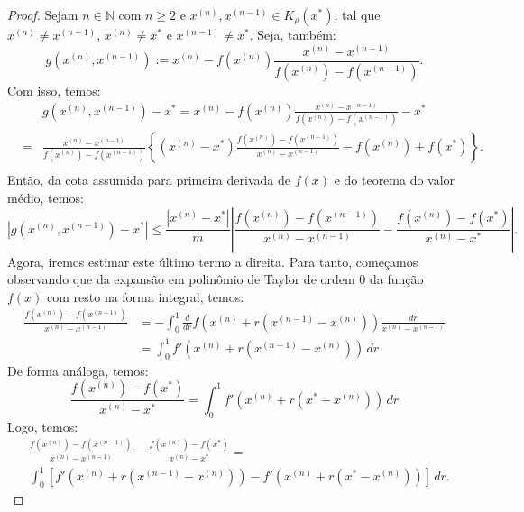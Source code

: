 \begin{proof}
  Sejam $n\in\mathbb{N}$ com $n\geq 2$ e $x^{(n)}, x^{(n-1)}\in K_\rho(x^*)$, tal que $x^{(n)}\neq x^{(n-1)}$, $x^{(n)}\neq x^*$ e $x^{(n-1)}\neq x^*$. Seja, também:
  \begin{equation*}
    g(x^{(n)},x^{(n-1)}) := x^{(n)} - f(x^{(n)})\frac{x^{(n)} - x^{(n-1)}}{f(x^{(n)}) - f(x^{(n-1)})}.
  \end{equation*}
Com isso, temos:
  \begin{eqnarray*}
    &&g(x^{(n)},x^{(n-1)}) - x^* = x^{(n)} - f(x^{(n)})\frac{x^{(n)} - x^{(n-1)}}{f(x^{(n)}) - f(x^{(n-1)})} - x^*\\
    &=& \frac{x^{(n)} - x^{(n-1)}}{f(x^{(n)}) - f(x^{(n-1)})}\left\{(x^{(n)} - x^*)\frac{f(x^{(n)}) - f(x^{(n-1)})}{x^{(n)} - x^{(n-1)}} - f(x^{(n)}) + f(x^*)\right\}.\\
  \end{eqnarray*}
Então, da cota assumida para primeira derivada de $f(x)$ e do teorema do valor médio, temos: 
\begin{equation}\label{eq:secantes-est0}
  |g(x^{(n)},x^{(n-1)}) - x^*| \leq \frac{|x^{(n)} - x^*|}{m}\left|\frac{f(x^{(n)}) - f(x^{(n-1)})}{x^{(n)} - x^{(n-1)}} - \frac{f(x^{(n)}) - f(x^*)}{x^{(n)} - x^*}\right|.
\end{equation}
Agora, iremos estimar este último termo a direita. Para tanto, começamos observando que da expansão em polinômio de Taylor de ordem $0$ da função $f(x)$ com resto na forma integral, temos:
\begin{eqnarray*}
  \frac{f(x^{(n)}) - f(x^{(n-1)})}{x^{(n)} - x^{(n-1)}} &= -\int_0^1 \frac{d}{dr}f(x^{(n)} + r(x^{(n-1)} - x^{(n)}))\frac{dr}{x^{(n)} - x^{(n-1)}}\\
  &= \int_0^1 f'(x^{(n)} + r(x^{(n-1)} - x^{(n)}))\,dr
\end{eqnarray*}
De forma análoga, temos:
\begin{equation*}
  \frac{f(x^{(n)}) - f(x^*)}{x^{(n)} - x^*} = \int_0^1 f'(x^{(n)} + r(x^* - x^{(n)}))\,dr
\end{equation*}
Logo, temos:
\begin{equation}\label{eq:secantes-0}
  \begin{split}
  &\frac{f(x^{(n)}) - f(x^{(n-1)})}{x^{(n)} - x^{(n-1)}} - \frac{f(x^{(n)}) - f(x^*)}{x^{(n)} - x^*} = \\
  &\int_0^1 \left[f'(x^{(n)} + r(x^{(n-1)} - x^{(n)})) - f'(x^{(n)} + r(x^* - x^{(n)}))\right]\,dr.    
  \end{split}
\end{equation}

\end{proof}
